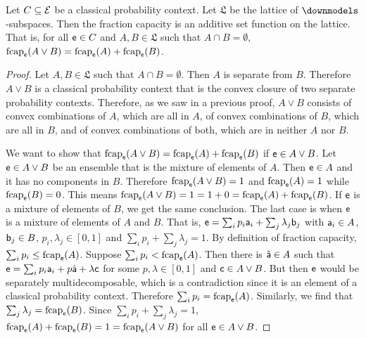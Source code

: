 \begin{mathSection}
	\begin{prop}
		Let $C \subseteq \Ens$ be a classical probability context. Let $\mathfrak{L}$ be the lattice of $\separate$-subspaces. Then the fraction capacity is an additive set function on the lattice. That is, for all $\ens \in C$ and $A, B \in \mathfrak{L}$ such that $A \cap B = \emptyset$,  $\fcap_{\ens}(A \vee B) = \fcap_{\ens}(A) + \fcap_{\ens}(B)$.
	\end{prop}
	
	\begin{proof}
		Let $A, B\in \mathfrak{L}$ such that $A \cap B = \emptyset$. Then $A$ is separate from $B$. Therefore $A \vee B$ is a classical probability context that is the convex closure of two separate probability contexts. Therefore, as we saw in a previous proof, $A \vee B$ consists of convex combinations of $A$, which are all in $A$, of convex combinations of $B$, which are all in $B$, and of convex combinations of both, which are in neither $A$ nor $B$.
		
		We want to show that $\fcap_{\ens}(A \vee B) = \fcap_{\ens}(A) + \fcap_{\ens}(B)$ if $\ens \in A \vee B$. Let $\ens \in A \vee B$ be an ensemble that is the mixture of elements of $A$. Then $\ens \in A$ and it has no components in $B$. Therefore $\fcap_{\ens}(A \vee B) = 1$ and $\fcap_{\ens}(A) = 1$ while $\fcap_{\ens}(B) = 0$. This means $\fcap_{\ens}(A \vee B) = 1 = 1 + 0 = \fcap_{\ens}(A) + \fcap_{\ens}(B)$. If $\ens$ is a mixture of elements of $B$, we get the same conclusion. The last case is when $\ens$ is a mixture of elements of $A$ and $B$. That is, $\ens = \sum_i p_i \ens[a]_i + \sum_j \lambda_j \ens[b]_j$ with $\ens[a]_i \in A$, $\ens[b]_j \in B$, $p_i, \lambda_j \in [0,1]$ and $\sum_i p_i + \sum_j \lambda_j = 1$. By definition of fraction capacity, $\sum_i p_i \leq \fcap_{\ens}(A)$. Suppose $\sum_i p_i < \fcap_{\ens}(A)$. Then there is $\hat{\ens[a]} \in A$ such that $\ens = \sum_i p_i \ens[a]_i + p \hat{\ens[a]} + \lambda \ens[c]$ for some $p,\lambda \in [0,1]$ and $\ens[c] \in A \vee B$. But then $\ens$ would be separately multidecomposable, which is a contradiction since it is an element of a classical probability context. Therefore $\sum_i p_i = \fcap_{\ens}(A)$. Similarly, we find that $\sum_j \lambda_j = \fcap_{\ens}(B)$. Since $\sum_i p_i + \sum_j \lambda_j = 1$, $\fcap_{\ens}(A) + \fcap_{\ens}(B) = 1 = \fcap_{\ens}(A \vee B)$ for all $\ens \in A \vee B$.
		

\end{proof}
\end{mathSection}
